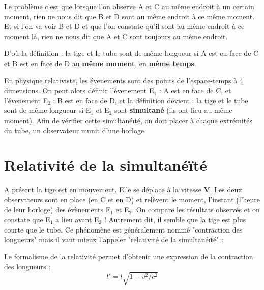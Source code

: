 
Le problème c'est que lorsque l'on observe A et C au même endroit à un certain moment, rien ne nous dit que B et D sont au même endroit à ce même moment. Et si l'on va voir B et D et que l'on constate qu'il sont au même endroit à ce moment là, rien ne nous dit que A et C sont toujours au même endroit.

D'où la définition : la tige et le tube sont de même longueur si A est en face de C et B est en face de D au {\bf même moment}, en {\bf même temps}.

En physique relativiste, les évenements sont des points de l'espace-temps à 4 dimensions.
On peut alors définir l'évenement E$_1$ : A est en face de C, et l'évenement E$_2$ : B est en face de D, et la définition devient : la tige et le tube sont de même longueur si E$_1$ et E$_2$ sont {\bf simultané} (ils ont lieu au même moment). Afin de vérifier cette simultanéïté, on doit placer à chaque extrémités du tube, un observateur munit d'une horloge.

\section{Relativité de la simultanéïté}

A présent la tige est en mouvement. Elle se déplace à la vitesse {\bf V}. Les deux observateurs sont en place (en C et en D) et relèvent le moment, l'instant (l'heure de leur horloge) des évènements E$_1$ et E$_2$. On compare les résultats observés et on constate que E$_1$ a lieu avant E$_2$ ! Autrement dit, il semble que la tige est plus courte que le tube. Ce phénomène est généralement nommé "contraction des longueurs" mais il vaut mieux l'appeler "relativité de la simultanéïté" : 
\begin{center}
\end{center}

Le formalisme de la relativité permet d'obtenir une expression de la contraction des longueurs : 
\[
l'=l\sqrt{1-v^2/c^2}
\]

